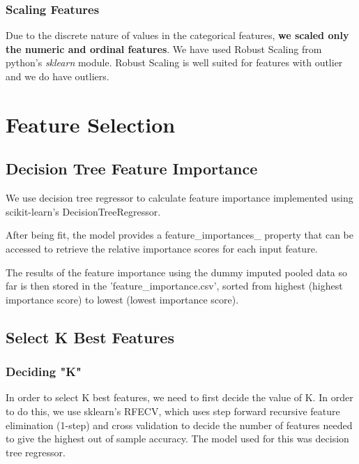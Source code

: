\documentclass{article}
\begin{document}
\subsubsection{Scaling Features}
Due to the discrete nature of values in the categorical features, \textbf{we scaled only the numeric and ordinal features}. We have used Robust Scaling from python's \textit{sklearn} module. Robust Scaling is well suited for features with outlier and we do have outliers.

%


\section{Feature Selection}
\subsection{Decision Tree Feature Importance}
We use decision tree regressor to calculate feature importance implemented using scikit-learn's DecisionTreeRegressor.

After being fit, the model provides a feature\_importances\_ property that can be accessed to retrieve the relative importance scores for each input feature.

The results of the feature importance using the dummy imputed pooled data so far is then stored in the 'feature\_importance.csv', sorted from highest (highest importance score) to lowest (lowest importance score).

\subsection{Select K Best Features}
\subsubsection{Deciding "K"}
In order to select K best features, we need to first decide the value of K. In order to do this, we use sklearn's RFECV, which uses step forward recursive feature elimination (1-step) and cross validation to decide the number of features needed to give the highest out of sample accuracy. The model used for this was decision tree regressor.
\end{document}
